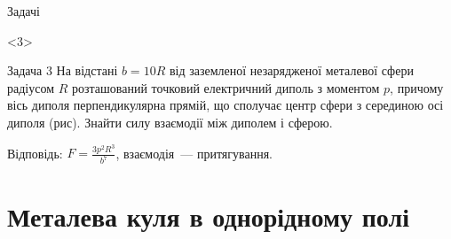 \documentclass{beamer}
\begin{document}
\begin{frame}{Задачі}{}
\begin{onlyenv}
	\end{onlyenv}

	\begin{onlyenv}
		\begin{exampleblock}{Задача 3}\justifying\small
			На відстані $b= 10R$ від заземленої незарядженої металевої сфери радіусом $R$ розташований
			точковий електричний диполь з моментом $p$, причому вісь диполя перпендикулярна прямій, що
			сполучає центр сфери з серединою осі диполя (рис). Знайти силу взаємодії між
			диполем і сферою.

			\medskip

			Відповідь: $F = \frac{3p^2R^3}{b^7}$, взаємодія~--- притягування.

			\begin{figure}[h!]\centering
				\label{Ovch2.32}
			\end{figure}
		\end{exampleblock}

	\end{onlyenv}

\end{frame}



\section{Металева куля в однорідному полі}
\end{document}
